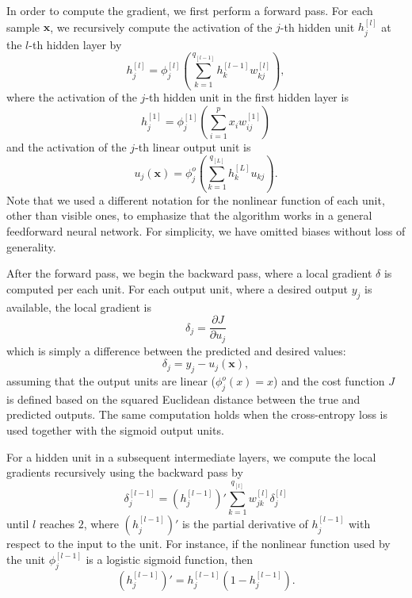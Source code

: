 \documentclass[dissertation,nocontribution]{aaltoseries}
\newcommand{\qlay}[1]{\left[#1\right]}
\newcommand{\vect}[1]{\mathbf{#1}}
\newcommand{\vx}[0]{\vect{x}}
\begin{document}
In order to compute the gradient, we first perform a
forward pass. For each sample $\vx$, we recursively
compute the activation of the $j$-th hidden unit
$h_j^{\qlay{l}}$
at the $l$-th hidden layer by
\[
h_j^{\qlay{l}} = \phi_j^{\qlay{l}}
\left(\sum_{k=1}^{q_{\qlay{l-1}}} h_k^{\qlay{l-1}}
w_{kj}^{\qlay{l}}\right),
\]
where the activation of the $j$-th hidden unit in the first
hidden layer is
\[
h_j^{\qlay{1}} = \phi_j^{\qlay{1}} \left(\sum_{i=1}^p x_i
w_{ij}^{\qlay{1}}\right)
\]
and the activation of the $j$-th linear output unit is 
\[
u_j(\vx) = \phi_j^{o} \left( \sum_{k=1}^{q_{\qlay{L}}}
h_{k}^{\qlay{L}} u_{kj}
\right).
\]
Note that we used a different notation for the nonlinear
function of each unit, other than visible ones, to emphasize
that the algorithm works in a general feedforward neural
network. 
For simplicity, we have omitted biases without loss of
generality.

After the forward pass, we begin the backward pass, where a local
gradient $\delta$ is computed per each unit.  For each output
unit, where a desired output $y_j$ is available, the local
gradient is
\[
\delta_j = \frac{\partial J}{\partial u_j} 
\]
which is simply a difference between the predicted and
desired values:
\[
\delta_j = y_j - u_j(\vx),
\]
assuming that the output units are linear
($\phi_j^o(x) = x$) and the cost function $J$ is defined
based on the squared Euclidean distance between the true and
predicted outputs. The same computation holds when the
cross-entropy loss is used together with the sigmoid output
units.

For a hidden unit in a subsequent intermediate layers, we
compute the local gradients recursively using the backward
pass
by
\[
\delta_j^{\qlay{l-1}} = \left(h_j^{\qlay{l-1}}\right)'
\sum_{k=1}^{q_{\qlay{l}}}
w_{jk}^{\qlay{l}} \delta_j^{\qlay{l}}
\]
until $l$ reaches $2$, where $\left(h_j^{\qlay{l-1}}\right)'$ is
the partial derivative of $h_j^{\qlay{l-1}}$ with respect to the
input to the unit. For instance, if the nonlinear function
used by the unit $\phi_j^{\qlay{l-1}}$ is a logistic sigmoid
function, then
\[
\left(h_j^{\qlay{l-1}}\right)' = h_j^{\qlay{l-1}} \left( 1 -
h_j^{\qlay{l-1}} \right).
\]
\end{document}
